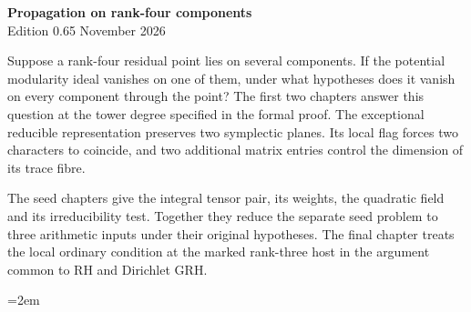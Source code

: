 \begin{center}
{\Large\bfseries Propagation on rank-four components}\\[4pt]
Edition 0.65  November 2026
\end{center}

Suppose a rank-four residual point lies on several components. If the
potential modularity ideal vanishes on one of them, under what
hypotheses does it vanish on every component through the point?
The first two chapters answer this question at the tower degree
specified in the formal proof. The exceptional reducible
representation preserves two symplectic planes. Its local flag forces
two characters to coincide, and two additional matrix entries control
the dimension of its trace fibre.

The seed chapters give the integral tensor pair, its weights, the quadratic
field and its irreducibility test. Together they reduce the separate
seed problem to three arithmetic inputs under their original hypotheses.
The final chapter treats the local ordinary condition
at the marked rank-three host in the argument common to RH and Dirichlet GRH.

\begingroup\emergencystretch=2em








\endgroup
